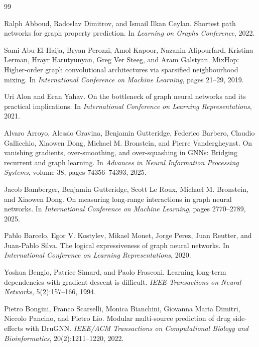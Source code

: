 \begin{thebibliography}{99}

Ralph Abboud, Radoslav Dimitrov, and Ismail Ilkan Ceylan.
\newblock Shortest path networks for graph property prediction.
\newblock In \emph{Learning on Graphs Conference}, 2022.

Sami Abu-El-Haija, Bryan Perozzi, Amol Kapoor, Nazanin Alipourfard, Kristina Lerman, Hrayr Harutyunyan, Greg Ver Steeg, and Aram Galstyan.
\newblock MixHop: Higher-order graph convolutional architectures via sparsified neighbourhood mixing.
\newblock In \emph{International Conference on Machine Learning}, pages 21--29, 2019.

Uri Alon and Eran Yahav.
\newblock On the bottleneck of graph neural networks and its practical implications.
\newblock In \emph{International Conference on Learning Representations}, 2021.

Alvaro Arroyo, Alessio Gravina, Benjamin Gutteridge, Federico Barbero, Claudio Gallicchio, Xiaowen Dong, Michael M. Bronstein, and Pierre Vandergheynst.
\newblock On vanishing gradients, over-smoothing, and over-squashing in GNNs: Bridging recurrent and graph learning.
\newblock In \emph{Advances in Neural Information Processing Systems}, volume 38, pages 74356--74393, 2025.

Jacob Bamberger, Benjamin Gutteridge, Scott Le Roux, Michael M. Bronstein, and Xiaowen Dong.
\newblock On measuring long-range interactions in graph neural networks.
\newblock In \emph{International Conference on Machine Learning}, pages 2770--2789, 2025.

Pablo Barcelo, Egor V. Kostylev, Mikael Monet, Jorge Perez, Juan Reutter, and Juan-Pablo Silva.
\newblock The logical expressiveness of graph neural networks.
\newblock In \emph{International Conference on Learning Representations}, 2020.

Yoshua Bengio, Patrice Simard, and Paolo Frasconi.
\newblock Learning long-term dependencies with gradient descent is difficult.
\newblock \emph{IEEE Transactions on Neural Networks}, 5(2):157--166, 1994.

Pietro Bongini, Franco Scarselli, Monica Bianchini, Giovanna Maria Dimitri, Niccolo Pancino, and Pietro Lio.
\newblock Modular multi-source prediction of drug side-effects with DruGNN.
\newblock \emph{IEEE/ACM Transactions on Computational Biology and Bioinformatics}, 20(2):1211--1220, 2022.


\end{thebibliography}
